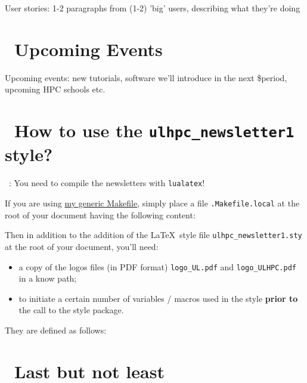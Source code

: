 \documentclass[a4paper]{article}
\begin{document}
User stories: 1-2 paragraphs from (1-2) 'big' users, describing what
they're doing

\section{\faCalendar\ Upcoming Events}
Upcoming events: new tutorials, software we'll introduce in the next
\$period, upcoming HPC schools etc.

\section{\faCogs\ How to use the \texttt{ulhpc\_newsletter1} style?}

\faWarningSign\ : You need to compile the newsletters with \texttt{lualatex}! 

If you are using \href{https://github.com/Falkor/Makefiles/blob/devel/latex/Makefile}{my generic Makefile}, simply place a file \texttt{.Makefile.local} at the root of your document having the following content:



Then in addition to the addition of the \LaTeX\ style file \texttt{ulhpc\_newsletter1.sty} at the root of your document, you'll need: 

\begin{itemize}
  \item a copy of the logos files (in PDF format) \texttt{logo\_UL.pdf} and \texttt{logo\_ULHPC.pdf} in a know path;
  \item to initiate a certain number of variables / macros used in the style \textbf{prior to} the call to the style package.
\end{itemize}

They are defined as follows: 






\section{\faBeer\ Last but not least}

\lipsum[2-8]
\end{document}

